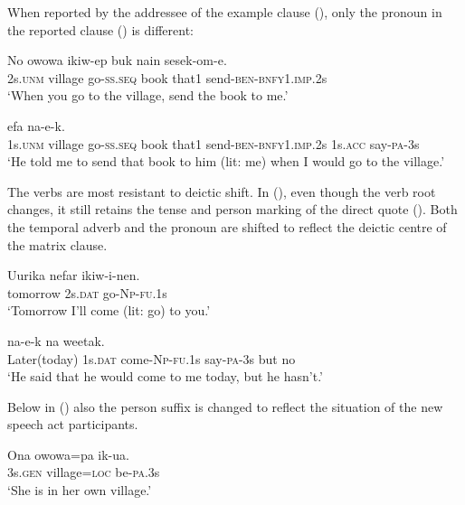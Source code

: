 When reported by the addressee of the example clause (), only the pronoun in the reported clause () is different:

\ea%
\label{ex:x1281}
\gll No  owowa  ikiw-ep  buk  nain  sesek-om-e.\\
2s.\textsc{unm} village  go-\textsc{ss}.\textsc{seq} book that1  send-\textsc{ben}-\textsc{bnfy}1.\textsc{imp}.2s\\
\glt`When you go to the village, send the book to me.'
\z


\ea%
\label{ex:x1282}
 efa  na-e-k. \\
1s.\textsc{unm} village go-\textsc{ss}.\textsc{seq} book that1 send-\textsc{ben}-\textsc{bnfy}1.\textsc{imp}.2s 1s.\textsc{acc} say-\textsc{pa}-3s\\
\glt`He told me to send that book to him (lit: me) when I would go to the village.'
\z


The verbs are most resistant to deictic shift. In (), even though the verb root changes, it still retains the tense and person marking of the direct quote (). Both the temporal adverb and the pronoun are shifted to reflect the deictic centre of the matrix clause.

\ea%
\label{ex:x1264}
\gll Uurika  nefar  ikiw-i-nen. \\
tomorrow  2s.\textsc{dat} go-\textsc{Np}-\textsc{fu}.1s\\
\glt`Tomorrow I'll come (lit: go) to you.'
\z


\ea%
\label{ex:x1265}
  na-e-k  na  weetak.\\
Later(today)  1s.\textsc{dat} come-\textsc{Np}-\textsc{fu}.1s  say-\textsc{pa}-3s but no\\
\glt`He said that he would come to me today, but he hasn't.'
\z


Below in () also the person suffix is changed to reflect the situation of the new speech act participants. 

\ea%
\label{ex:x1267}
\gll Ona  owowa=pa  ik-ua.\\
3s.\textsc{gen} village=\textsc{loc} be-\textsc{pa}.3s\\
\glt`She is in her own village.'
\z


